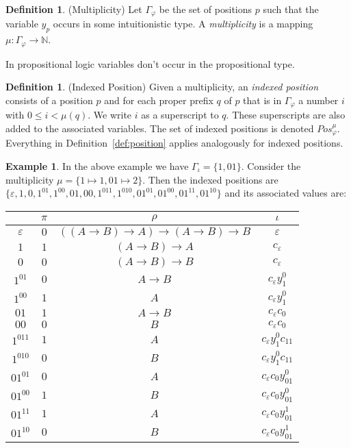 \documentclass[11pt]{article}
\theoremstyle{definition}
\theoremstyle{definition}
\theoremstyle{definition}
\theoremstyle{definition}
\theoremstyle{definition}
\newtheorem{definition}[theorem]{Definition}
\theoremstyle{definition}
\newtheorem{example}[theorem]{Example}
\theoremstyle{definition}
\newcommand{\N}{\mathbb N}
\newcommand{\pos}{\mathit{Pos}}
\begin{document}
	\begin{definition}(Multiplicity)
		Let $\Gamma_\varphi$ be the set of positions $p$ such that the variable $y_p$ occurs in some intuitionistic type. A \emph{multiplicity} is a mapping $\mu: \Gamma_\varphi\to\N$.
	\end{definition}

	In propositional logic variables don't occur in the propositional type.

	\begin{definition}(Indexed Position)
		Given a multiplicity, an \emph{indexed position} consists of a position $p$ and for each proper prefix $q$ of $p$ that is in $\Gamma_\varphi$ a number $i$ with $0\leq i<\mu(q)$. We write $i$ as a superscript to $q$. These superscripts are also added to the associated variables. The set of indexed positions is denoted $\pos_\varphi^\mu$. Everything in Definition~\ref{def:position} applies analogously for indexed positions.
	\end{definition}

	\begin{example}
		In the above example we have $\Gamma_\iota = \{1, 01\}$. Consider the multiplicity $\mu = \{1\mapsto 1, 01\mapsto 2\}$. Then the indexed positions are $\{\varepsilon, 1, 0, 1^01, 1^00, 01, 00, 1^011, 1^010, 01^01, 01^00, 01^11, 01^10\}$ and its associated values are:
		\begin{center}
			\begin{tabular}{c|c|c|c}
				&$\pi$&$\rho$&$\iota$\\\hline
				$\varepsilon$&$0$&$((A\to B)\to A)\to(A\to B)\to B$&$\varepsilon$\\
				$1$&$1$&$(A\to B)\to A$&$c_\varepsilon$\\
				$0$&$0$&$(A\to B)\to B$&$c_\varepsilon$\\
				$1^01$&$0$&$A\to B$&$c_\varepsilon y_1^0$\\
				$1^00$&$1$&$A$&$c_\varepsilon y_1^0$\\
				$01$&$1$&$A\to B$&$c_\varepsilon c_0$\\
				$00$&$0$&$B$&$c_\varepsilon c_0$\\
				$1^011$&$1$&$A$&$c_\varepsilon y_1^0c_{11}$\\
				$1^010$&$0$&$B$&$c_\varepsilon y_1^0c_{11}$\\
				$01^01$&$0$&$A$&$c_\varepsilon c_0y_{01}^0$\\
				$01^00$&$1$&$B$&$c_\varepsilon c_0y_{01}^0$\\
				$01^11$&$1$&$A$&$c_\varepsilon c_0y_{01}^1$\\
				$01^10$&$0$&$B$&$c_\varepsilon c_0y_{01}^1$
			\end{tabular}
			\end{center}
	\end{example}
\end{document}
